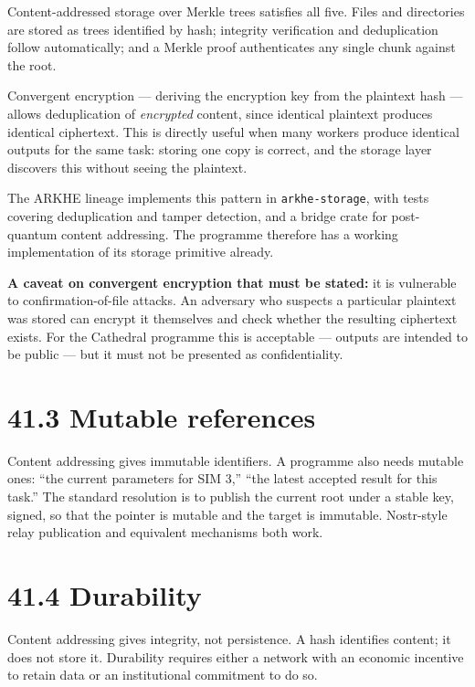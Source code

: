\documentclass[
  11pt]{report}
\begin{document}
Content-addressed storage over Merkle trees satisfies all five. Files
and directories are stored as trees identified by hash; integrity
verification and deduplication follow automatically; and a Merkle proof
authenticates any single chunk against the root.

Convergent encryption --- deriving the encryption key from the plaintext
hash --- allows deduplication of \emph{encrypted} content, since
identical plaintext produces identical ciphertext. This is directly
useful when many workers produce identical outputs for the same task:
storing one copy is correct, and the storage layer discovers this
without seeing the plaintext.

The ARKHE lineage implements this pattern in \texttt{arkhe-storage},
with tests covering deduplication and tamper detection, and a bridge
crate for post-quantum content addressing. The programme therefore has a
working implementation of its storage primitive already.

\textbf{A caveat on convergent encryption that must be stated:} it is
vulnerable to confirmation-of-file attacks. An adversary who suspects a
particular plaintext was stored can encrypt it themselves and check
whether the resulting ciphertext exists. For the Cathedral programme
this is acceptable --- outputs are intended to be public --- but it must
not be presented as confidentiality.

\hypertarget{mutable-references}{%
\section{41.3 Mutable references}\label{mutable-references}}

Content addressing gives immutable identifiers. A programme also needs
mutable ones: ``the current parameters for SIM 3,'' ``the latest
accepted result for this task.'' The standard resolution is to publish
the current root under a stable key, signed, so that the pointer is
mutable and the target is immutable. Nostr-style relay publication and
equivalent mechanisms both work.

\hypertarget{durability}{%
\section{41.4 Durability}\label{durability}}

Content addressing gives integrity, not persistence. A hash identifies
content; it does not store it. Durability requires either a network with
an economic incentive to retain data or an institutional commitment to
do so.
\end{document}
